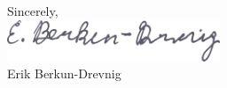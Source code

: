 \bigskip
\noindent
Sincerely,\\
\vspace{-0.1in}
\includegraphics[width=2.5in, trim=0 0 0 -1in]{signature.pdf}\\
Erik Berkun-Drevnig